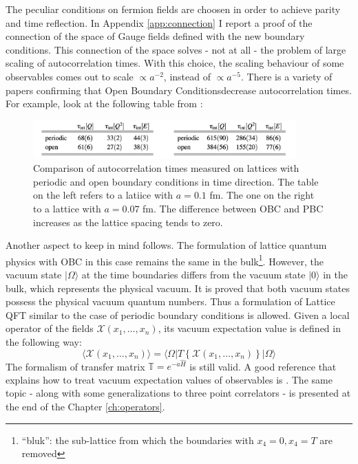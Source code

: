 \documentclass[english, LaM, oneside, noexaminfo]{sapthesis}
\newcommand{\la}{\langle}
\newcommand{\ra}{\rangle}
\newcommand{\obc}{Open Boundary Conditions}
\begin{document}
The peculiar conditions on fermion fields are choosen in order to achieve parity and time reflection.
In Appendix \ref{app:connection} I report a proof of the connection of the space of Gauge fields defined with the new boundary conditions.
This connection of the space solves - not at all - the problem of large scaling of autocorrelation times.
With this choice, the scaling behaviour of some observables comes out to scale $\propto a^{-2}$, instead of $\propto a^{-5}$.
There is a variety of papers confirming that \obc\space decrease autocorrelation times.
For example, look at the following table from \cite{Topology-WilsonFlow-HMC}:
\begin{figure}[h!]
    \centering
    \includegraphics[width=0.9\textwidth]{imgs-MSc-thesis/autocorrelation.png}
    \caption{Comparison of autocorrelation times measured on lattices with periodic and open boundary conditions in time direction.
    The table on the left refers to a latiice with $a=0.1$ fm. The one on the right to a lattice with $a=0.07$ fm. The difference between OBC and PBC increases as the lattice spacing tends to zero. \cite{Topology-WilsonFlow-HMC}}
    \label{tab:autocorrelation-times}
\end{figure}
\newline
Another aspect to keep in mind follows.
The formulation of lattice quantum physics with OBC in this case remains the same in the bulk\footnote{``bluk'': the sub-lattice from which the boundaries with $x_4 = 0, x_4 = T$ are removed}.
However, the vacuum state $|\Omega\ra$ at the time boundaries differs from the vacuum state $|0\ra$ in the bulk, which represents the physical vacuum.
It is proved \cite{OBC_top} that both vacuum states possess the physical vacuum quantum numbers.
Thus a formulation of Lattice QFT similar to the case of periodic boundary conditions is allowed.
Given a local operator of the fields $\mathcal{X}(x_1,\dots,x_n)$, its vacuum expectation value is defined in the following way:
\begin{equation*}
    \la \mathcal{X}(x_1,\dots,x_n) \ra = \la \Omega | T \left\{ \mathcal{X}(x_1,\dots,x_n) \right\} | \Omega \ra
\end{equation*}
The formalism of transfer matrix $\mathbb{T} = e^{-a\hat H}$ is still valid.
A good reference that explains how to treat vacuum expectation values of observables is \cite{ExtractionSpectralQuantities}.
The same topic - along with some generalizations to three point correlators - is presented at the end of the Chapter \ref{ch:operators}.
\end{document}
